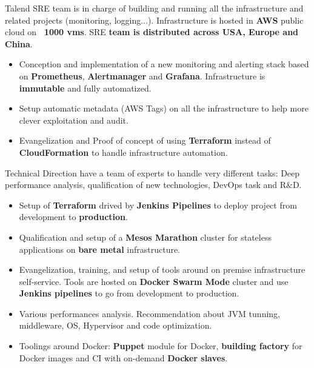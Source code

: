 \documentclass[10pt,a4paper,ragged2e]{altacv}
\begin{document}

		Talend SRE team is in charge of building and running all the infrastructure and related projects (monitoring, logging...). Infrastructure is hosted in \textbf{AWS} public cloud on\textbf{ ~1000 vms}. SRE \textbf{team is distributed across USA, Europe and China}.
	
		\medskip
		\begin{itemize}
			\item Conception and implementation of a new monitoring and alerting stack based on \textbf{Prometheus}, \textbf{Alertmanager} and \textbf{Grafana}. Infrastructure is \textbf{immutable} and fully automatized.
			\item Setup automatic metadata (AWS Tags) on all the infrastructure to help more clever exploitation and audit.
			\item Evangelization and Proof of concept of using \textbf{Terraform} instead of \textbf{CloudFormation} to handle infrastructure automation.
		\end{itemize}
	\divider

	
		Technical Direction have a team of experts to handle very different tasks: Deep performance analysis, qualification of new technologies, DevOps task and R\&D.
		
		\medskip
		\begin{itemize}
			\item Setup of \textbf{Terraform} drived by \textbf{Jenkins Pipelines} to deploy project from development to \textbf{production}.
			\item Qualification and setup of a\textbf{ Mesos Marathon} cluster for stateless applications on \textbf{bare metal} infrastructure.
			\item Evangelization, training, and setup of tools around on premise infrastructure self-service. Tools are hosted on \textbf{Docker Swarm Mode} cluster and use \textbf{Jenkins pipelines} to go from development to production.
			\item Various performances analysis. Recommendation about JVM tunning, middleware, OS, Hypervisor and code optimization.
			\item Toolings around Docker: \textbf{Puppet} module for Docker, \textbf{building factory} for Docker images and CI with on-demand \textbf{Docker slaves}.
		\end{itemize}
	\divider
\end{document}
